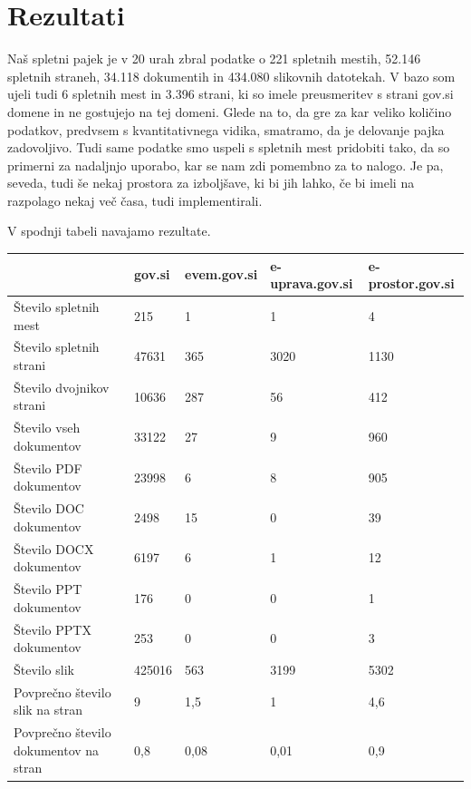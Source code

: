 \documentclass[conference]{IEEEtran}
\begin{document}
	\section{Rezultati}
	Naš spletni pajek je v 20 urah zbral podatke o 221 spletnih mestih, 52.146 spletnih straneh, 34.118 dokumentih in 434.080 slikovnih datotekah. V bazo som ujeli tudi 6 spletnih mest in 3.396 strani, ki so imele preusmeritev s strani gov.si domene in ne gostujejo na tej domeni. Glede na to, da gre za kar veliko količino podatkov, predvsem s kvantitativnega vidika, smatramo, da je delovanje pajka zadovoljivo. Tudi same podatke smo uspeli s spletnih mest pridobiti tako, da so primerni za nadaljnjo uporabo, kar se nam zdi pomembno za to nalogo. Je pa, seveda, tudi še nekaj prostora za izboljšave, ki bi jih lahko, če bi imeli na razpolago nekaj več časa, tudi implementirali.
	
	V spodnji tabeli navajamo rezultate.
	
		

\begin{flushleft}
\begin{tabular}{ |l|l|l|l|l| } 
 \hline
  &  gov.si & evem.gov.si & e-uprava.gov.si & e-prostor.gov.si  \\
 \hline
 Število spletnih mest &  215 & 1 & 1 & 4  \\ 
 \hline
 Število spletnih strani &  47631 & 365 & 3020 & 1130  \\  
 \hline
 Število dvojnikov strani &  10636 & 287 & 56 & 412 \\
 \hline
 Število vseh dokumentov &  33122 & 27 & 9 & 960 \\
 \hline
 Število PDF dokumentov &  23998 & 6 & 8 & 905 \\
 \hline
 Število DOC dokumentov &  2498 & 15 & 0 & 39 \\
 \hline
 Število DOCX dokumentov &  6197 & 6 & 1 & 12 \\
 \hline
 Število PPT dokumentov &  176 & 0 & 0 & 1 \\
 \hline
 Število PPTX dokumentov &  253 & 0 & 0 & 3 \\
 \hline
 Število slik &  425016 & 563 & 3199 & 5302 \\
 \hline
 Povprečno število slik na stran &  9 & 1,5 & 1 & 4,6 \\
 \hline
 Povprečno število dokumentov na stran &  0,8 & 0,08 & 0,01 & 0,9 \\
 \hline
\end{tabular}
\end{flushleft}


	
	

	
	
	
	
\end{document}
